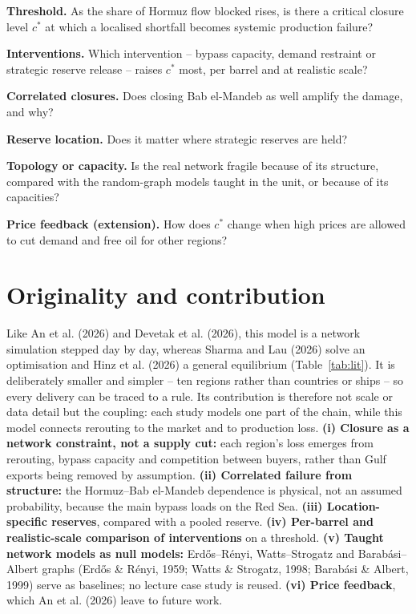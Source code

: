 \documentclass[11pt,a4paper]{article}
\begin{document}
\begin{description}[leftmargin=2.2em,labelwidth=1.8em,labelsep=0.4em,itemsep=0pt,topsep=1pt,parsep=0pt,font=\normalfont\bfseries]
\item[Q1] \textbf{Threshold.} As the share of Hormuz flow blocked rises, is there a critical closure level $c^{*}$ at which a localised shortfall becomes systemic production failure?
\item[Q2] \textbf{Interventions.} Which intervention -- bypass capacity, demand restraint or strategic reserve release -- raises $c^{*}$ most, per barrel and at realistic scale?
\item[Q3] \textbf{Correlated closures.} Does closing Bab el-Mandeb as well amplify the damage, and why?
\item[Q4] \textbf{Reserve location.} Does it matter where strategic reserves are held?
\item[Q5] \textbf{Topology or capacity.} Is the real network fragile because of its structure, compared with the random-graph models taught in the unit, or because of its capacities?
\item[Q6] \textbf{Price feedback (extension).} How does $c^{*}$ change when high prices are allowed to cut demand and free oil for other regions?
\end{description}


\section{Originality and contribution}

Like An et al. (2026) and Devetak et al. (2026), this model is a network simulation stepped day by day, whereas Sharma and Lau (2026) solve an optimisation and Hinz et al. (2026) a general equilibrium (Table~\ref{tab:lit}). It is deliberately smaller and simpler -- ten regions rather than countries or ships -- so every delivery can be traced to a rule. Its contribution is therefore not scale or data detail but the coupling: each study models one part of the chain, while this model connects rerouting to the market and to production loss. \textbf{(i) Closure as a network constraint, not a supply cut:} each region's loss emerges from rerouting, bypass capacity and competition between buyers, rather than Gulf exports being removed by assumption. \textbf{(ii) Correlated failure from structure:} the Hormuz--Bab el-Mandeb dependence is physical, not an assumed probability, because the main bypass loads on the Red Sea. \textbf{(iii) Location-specific reserves}, compared with a pooled reserve. \textbf{(iv) Per-barrel and realistic-scale comparison of interventions} on a threshold. \textbf{(v) Taught network models as null models:} Erdős--Rényi, Watts--Strogatz and Barabási--Albert graphs (Erdős \& Rényi, 1959; Watts \& Strogatz, 1998; Barabási \& Albert, 1999) serve as baselines; no lecture case study is reused. \textbf{(vi) Price feedback}, which An et al. (2026) leave to future work.
\end{document}
